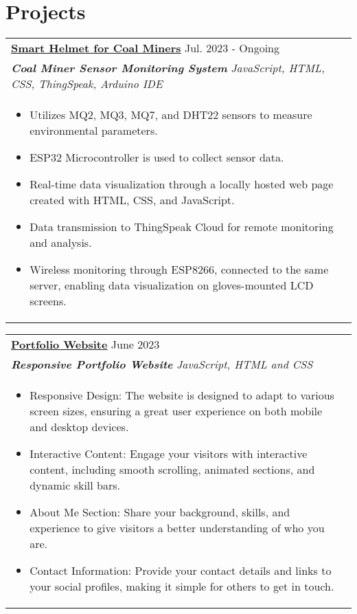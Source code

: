 \documentclass[a4paper,8pt]{article}
\begin{document}
\section{Projects}
\begin{tabularx}{\linewidth}{ @{}l r@{} }
\color[HTML]{1C033C} \textbf{\uline{\href{https://github.com/Deepakbari890/CoalMinersHelmet}{Smart Helmet for Coal Miners}}} \hfill \color[HTML]{371e77} Jul. 2023 - Ongoing \\[4pt]
\color[HTML]{371e77}\textbf{\textit{Coal Miner Sensor Monitoring System }} \hfill \color[HTML]{4B28A4} \textit{ JavaScript, HTML, CSS, ThingSpeak, Arduino IDE} \\[5pt]
\begin{minipage}[t]{\linewidth}
    \begin{itemize}[nosep,after=\strut, leftmargin=2em, itemsep=2pt]
        \item Utilizes MQ2, MQ3, MQ7, and DHT22 sensors to measure environmental parameters.
        \item ESP32 Microcontroller is used to collect sensor data.
        \item Real-time data visualization through a locally hosted web page created with HTML, CSS, and JavaScript.
        \item Data transmission to ThingSpeak Cloud for remote monitoring and analysis.
        \item Wireless monitoring through ESP8266, connected to the same server, enabling data visualization on gloves-mounted LCD screens.
    \end{itemize}
    \end{minipage}
\end{tabularx}

\begin{tabularx}{\linewidth}{ @{}l r@{} }
\color[HTML]{1C033C} \textbf{\uline{\href{https://deepakbari890.github.io/Portfolio/}{Portfolio Website}}} \hfill \color[HTML]{371e77} June 2023 \\[4pt]
\color[HTML]{371e77}\textbf{\textit{Responsive Portfolio Website}} \hfill \color[HTML]{4B28A4} \textit{ JavaScript, HTML and CSS} \\[5pt]
\begin{minipage}[t]{\linewidth}
    \begin{itemize}[nosep,after=\strut, leftmargin=2em, itemsep=2pt]
        \item Responsive Design: The website is designed to adapt to various screen sizes, ensuring a great user experience on both mobile and desktop devices.
        \item Interactive Content: Engage your visitors with interactive content, including smooth scrolling, animated sections, and dynamic skill bars.
        \item About Me Section: Share your background, skills, and experience to give visitors a better understanding of who you are.
        \item Contact Information: Provide your contact details and links to your social profiles, making it simple for others to get in touch.
    \end{itemize}
    \end{minipage}
\end{tabularx}
\end{document}
